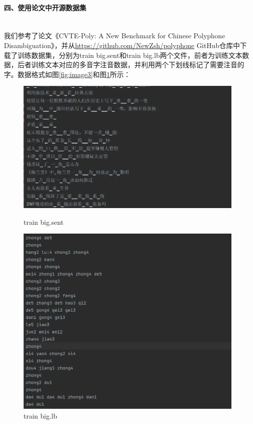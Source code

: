 \documentclass[12pt,hyperref,a4paper,UTF8]{ctexart}
\begin{document}
\paragraph{四、使用论文中开源数据集}\leavevmode\\
\indent 我们参考了论文《CVTE-Poly: A New Benchmark for Chinese Polyphone Disambiguation》，并从\url{https://github.com/NewZsh/polyphone} GitHub仓库中下载了训练数据集，分别为train big.sent和train big.lb两个文件，前者为训练文本数据，后者训练文本对应的多音字注音数据，并利用两个下划线标记了需要注音的字。数据格式如图\ref{fig:image3}和图\ref{fig:image4}所示：
\begin{figure}[htbp]
    \centering
    \begin{minipage}[b]{0.45\textwidth}
        \centering
        \includegraphics[width=\textwidth]{figures/image3.png} %
        \caption{train big.sent}
        \label{fig:image3}
    \end{minipage}
    \hspace{0.05\textwidth} %
    \begin{minipage}[b]{0.45\textwidth}
        \centering
        \includegraphics[width=\textwidth]{figures/image4.png} %
        \caption{train big.lb }
        \label{fig:image4}
    \end{minipage}
\end{figure}
\end{document}
